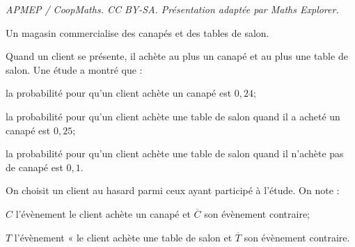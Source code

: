\documentclass[10pt]{article}
\begin{document}
\noindent\textit{APMEP / CoopMaths. CC BY-SA. Présentation adaptée par Maths Explorer.}\par\medskip
\bigskip

Un magasin commercialise des canapés et des tables de salon.

Quand un client se présente, il achète au plus un canapé et au plus une table de salon. Une étude a montré que :

\begin{list}{\textbullet}{}
\item la probabilité pour qu'un client achète un canapé est $0,24$;
\item la probabilité pour qu'un client achète une table de salon quand il a acheté un canapé est $0,25$;
\item la probabilité pour qu'un client achète une table de salon quand il n'achète pas de canapé est $0,1$.
\end{list}

On choisit un client au hasard parmi ceux ayant participé à l'étude. On note :

\begin{list}{\textbullet}{}
\item $C$ l'évènement \og le client achète un canapé \fg{} et $\overline{C}$ son évènement contraire;
\item $T$ l'évènement « le client achète une table de salon \fg{} et $\overline{T}$ son évènement contraire.
\end{list}
\end{document}

